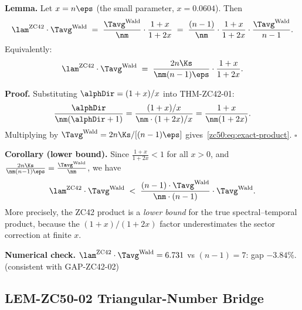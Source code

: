 \documentclass[12pt, a4paper]{article}
\begin{document}
\begin{formalbox}[title={LEM-ZC50-01: Exact Symbolic Form of
  $\lam^{\rm ZC42}\cdot\Tavg^{\rm Wald}$}]
\textbf{Lemma.}
Let $x = n\eps$ (the small parameter, $x = 0.0604$). Then
\[
  \lam^{\rm ZC42}\cdot\Tavg^{\rm Wald}
  \;=\; \frac{\Tavg^{\rm Wald}}{\nm}\cdot\frac{1+x}{1+2x}
  \;=\; \frac{(n-1)}{\nm}\cdot\frac{1+x}{1+2x}\cdot\frac{\Tavg^{\rm Wald}}{n-1}.
\]
Equivalently:
\begin{equation}\label{zc50:eq:exact-product}
  \lam^{\rm ZC42}\cdot\Tavg^{\rm Wald}
  \;=\; \frac{2n\Ks}{\nm(n-1)\eps}\cdot\frac{1+x}{1+2x}.
\end{equation}

\textbf{Proof.}
Substituting $\alphDir = (1+x)/x$ into THM-ZC42-01:
\[
  \frac{\alphDir}{\nm(\alphDir+1)}
  = \frac{(1+x)/x}{\nm\cdot(1+2x)/x}
  = \frac{1+x}{\nm(1+2x)}.
\]
Multiplying by $\Tavg^{\rm Wald} = 2n\Ks/[(n-1)\eps]$
gives~\eqref{zc50:eq:exact-product}. \hfill$\square$

\textbf{Corollary (lower bound).}
Since $\frac{1+x}{1+2x} < 1$ for all $x>0$, and
$\frac{2n\Ks}{\nm(n-1)\eps} = \frac{\Tavg^{\rm Wald}}{\nm}$, we have
\[
  \lam^{\rm ZC42}\cdot\Tavg^{\rm Wald}
  \;<\; \frac{(n-1)\cdot\Tavg^{\rm Wald}}{\nm\cdot(n-1)}
  \cdot\Tavg^{\rm Wald}.
\]
More precisely, the ZC42 product is a \emph{lower bound} for the true
spectral--temporal product, because the $(1+x)/(1+2x)$ factor
underestimates the sector correction at finite $x$.

\textbf{Numerical check.}
$\lam^{\rm ZC42}\cdot\Tavg^{\rm Wald} = 6.731$ vs
$(n-1) = 7$: gap $-3.84\%$. \hfill(consistent with GAP-ZC42-02)
\end{formalbox}

\subsection{LEM-ZC50-02 \quad Triangular-Number Bridge}

\end{document}
